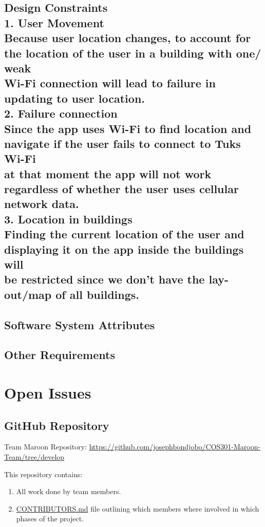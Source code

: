 \documentclass[a4paper,10pt]{article}
\begin{document}
	\subsection{Design Constraints		\\
		1. User Movement		\\
			Because user location changes, to account for the location of the user in a building with one/ weak  \\
			Wi-Fi connection will lead to failure in updating to user location.		\\
		2. Failure connection		\\
			Since the app uses Wi-Fi to find location and navigate if the user fails to connect to Tuks Wi-Fi \\
			at that moment the app will not work regardless of whether the user uses cellular network data.		\\
		3. Location in buildings 	\\
			Finding the current location of the user and displaying it on the app inside the buildings will \\
			be restricted since we don’t have the lay-out/map of all buildings.	\\
			
	}
	\subsection{Software System Attributes}
	\subsection{Other Requirements}

\clearpage
\section{Open Issues}
\subsection {GitHub Repository}
Team Maroon Repository: \url{https://github.com/josephbondjobo/COS301-Maroon-Team/tree/develop}

This repository contains:
\begin{enumerate}
\item All work done by team members.
\item \href{https://github.com/josephbondjobo/COS301-Maroon-Team/blob/develop/Intro/Contributors.md}{CONTRIBUTORS.md} file outlining which members where involved in which phases of the project.
\end{enumerate}



\newpage
\clearpage
{}
\end{document}
